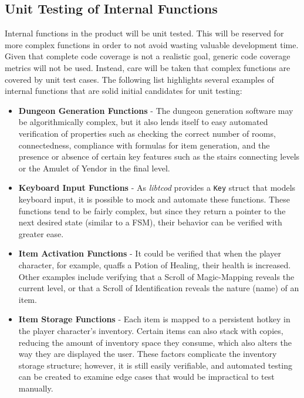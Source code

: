 \documentclass[12pt, titlepage]{article}
\begin{document}
	\subsection{Unit Testing of Internal Functions}
		Internal functions in the product will be unit tested.  This will be reserved for more complex functions in order to not avoid wasting valuable development time.  Given that complete code coverage is not a realistic goal, generic code coverage metrics will not be used.  Instead, care will be taken that complex functions are covered by unit test cases.  The following list highlights several examples of internal functions that are solid initial candidates for unit testing:

		\begin{itemize}
			\item \textbf{Dungeon Generation Functions} - The dungeon generation software may be algorithmically complex, but it also lends itself to easy automated verification of properties such as checking the correct number of rooms, connectedness, compliance with formulas for item generation, and the presence or absence of certain key features such as the stairs connecting levels or the Amulet of Yendor in the final level.
			\item \textbf{Keyboard Input Functions} - As \textit{libtcod} provides a \lstinline$Key$ struct that models keyboard input, it is possible to mock and automate these functions.  These functions tend to be fairly complex, but since they return a pointer to the next desired state (similar to a FSM), their behavior can be verified with greater ease.
			\item \textbf{Item Activation Functions} - It could be verified that when the player character, for example, quaffs a Potion of Healing, their health is increased.  Other examples include verifying that a Scroll of Magic-Mapping reveals the current level, or that a Scroll of Identification reveals the nature (name) of an item.
			\item \textbf{Item Storage Functions} - Each item is mapped to a persistent hotkey in the player character's inventory.  Certain items can also stack with copies, reducing the amount of inventory space they consume, which also alters the way they are displayed the user.  These factors complicate the inventory storage structure; however, it is still easily verifiable, and automated testing can be created to examine edge cases that would be impractical to test manually.
		\end{itemize}
\end{document}
